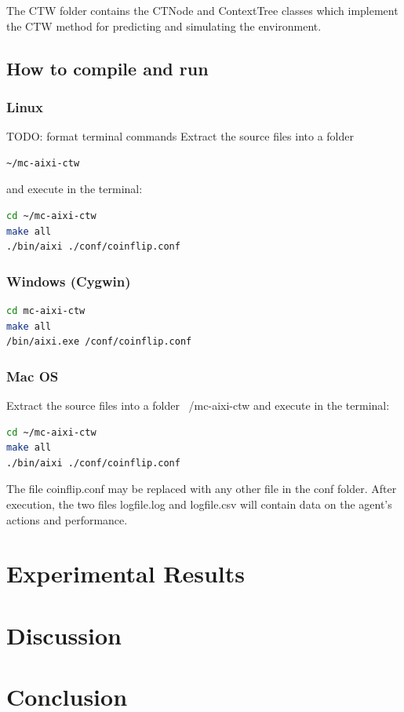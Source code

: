 \documentclass{article}
\theoremstyle{definition}
\newtheorem{primary statistics}[definition]{Primary Statistics}
\newtheorem{auxiliary statistics}[definition]{Auxiliary Statistics}
\begin{document}
The CTW folder contains the CTNode and ContextTree classes which implement the CTW method for predicting and simulating the environment.



\subsection{How to compile and run}
\subsubsection*{Linux}
TODO: format terminal commands 
Extract the source files into a folder 
\begin{lstlisting}[language=bash]
~/mc-aixi-ctw 
\end{lstlisting}
 and execute in the terminal:
 
\begin{lstlisting}[language=bash]
cd ~/mc-aixi-ctw
make all
./bin/aixi ./conf/coinflip.conf
\end{lstlisting}

\subsubsection*{Windows (Cygwin)}
\begin{lstlisting}[language=bash]
cd mc-aixi-ctw
make all
/bin/aixi.exe /conf/coinflip.conf
\end{lstlisting}


\subsubsection*{Mac OS}
Extract the source files into a folder ~/mc-aixi-ctw and execute in the terminal:
\begin{lstlisting}[language=bash]
cd ~/mc-aixi-ctw
make all
./bin/aixi ./conf/coinflip.conf
\end{lstlisting}

The file coinflip.conf may be replaced with any other file in the conf folder.
After execution, the two files logfile.log and logfile.csv will contain data on the agent’s actions and performance.




\section{Experimental Results}






\section{Discussion}







\section{Conclusion}








\printbibliography
\end{document}
